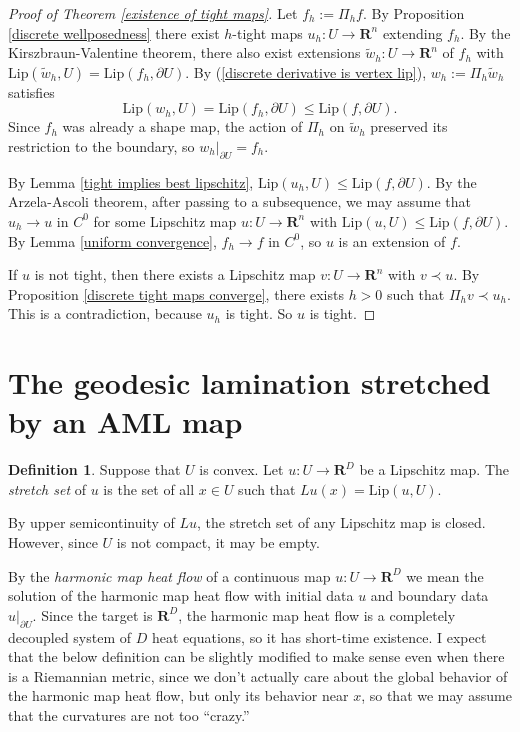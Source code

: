 \documentclass[reqno,11pt]{amsart}
\newcommand{\RR}{\mathbf{R}}
\newcommand{\Lip}{\mathrm{Lip}}
\newcommand{\dfn}[1]{\emph{#1}\index{#1}}
\theoremstyle{definition}
\newtheorem{definition}[theorem]{Definition}
\numberwithin{equation}{section}
\begin{document}
\begin{proof}[Proof of Theorem \ref{existence of tight maps}]
Let $f_h := \Pi_h f$.
By Proposition \ref{discrete wellposedness} there exist $h$-tight maps $u_h: U \to \RR^n$ extending $f_h$.
By the Kirszbraun-Valentine theorem, there also exist extensions $\tilde w_h: U \to \RR^n$ of $f_h$ with $\Lip(\tilde w_h, U) = \Lip(f_h, \partial U)$.
By (\ref{discrete derivative is vertex lip}), $w_h := \Pi_h \tilde w_h$ satisfies
$$\Lip(w_h, U) = \Lip(f_h, \partial U) \leq \Lip(f, \partial U).$$
Since $f_h$ was already a shape map, the action of $\Pi_h$ on $\tilde w_h$ preserved its restriction to the boundary, so $w_h|_{\partial U} = f_h$.

By Lemma \ref{tight implies best lipschitz}, $\Lip(u_h, U) \leq \Lip(f, \partial U)$.
By the Arzela-Ascoli theorem, after passing to a subsequence, we may assume that $u_h \to u$ in $C^0$ for some Lipschitz map $u: U \to \RR^n$ with $\Lip(u, U) \leq \Lip(f, \partial U)$.
By Lemma \ref{uniform convergence}, $f_h \to f$ in $C^0$, so $u$ is an extension of $f$.

If $u$ is not tight, then there exists a Lipschitz map $v: U \to \RR^n$ with $v \prec u$.
By Proposition \ref{discrete tight maps converge}, there exists $h > 0$ such that $\Pi_h v \prec u_h$.
This is a contradiction, because $u_h$ is tight.
So $u$ is tight.
\end{proof}

\section{The geodesic lamination stretched by an AML map}
\begin{definition}
Suppose that $U$ is convex.
Let $u: U \to \RR^D$ be a Lipschitz map.
The \dfn{stretch set} of $u$ is the set of all $x \in U$ such that $Lu(x) = \Lip(u, U)$.
\end{definition}

By upper semicontinuity of $Lu$, the stretch set of any Lipschitz map is closed.
However, since $U$ is not compact, it may be empty.

By the \dfn{harmonic map heat flow} of a continuous map $u: U \to \RR^D$ we mean the solution of the harmonic map heat flow with initial data $u$ and boundary data $u|_{\partial U}$.
Since the target is $\RR^D$, the harmonic map heat flow is a completely decoupled system of $D$ heat equations, so it has short-time existence.
I expect that the below definition can be slightly modified to make sense even when there is a Riemannian metric, since we don't actually care about the global behavior of the harmonic map heat flow, but only its behavior near $x$, so that we may assume that the curvatures are not too ``crazy.''
\end{document}
